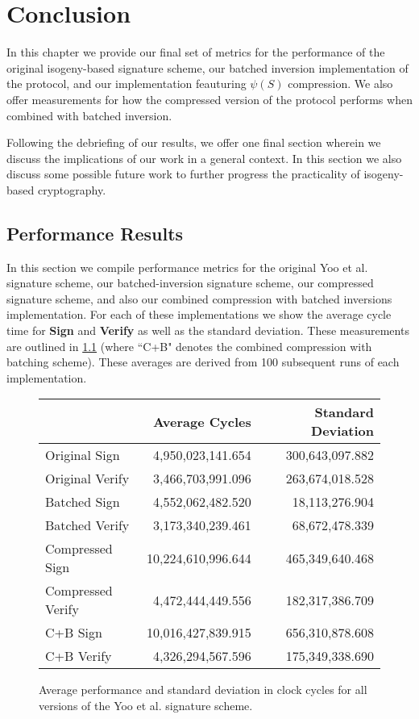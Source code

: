 \chapter{Conclusion}
\label{ch:conclusion}

In this chapter we provide our final set of metrics for the performance of the original isogeny-based signature scheme, our batched inversion implementation of the protocol, and our implementation feauturing $\psi(S)$ compression. We also offer measurements for how the compressed version of the protocol performs when combined with batched inversion.

Following the debriefing of our results, we offer one final section wherein we discuss the implications of our work in a general context. In this section we also discuss some possible future work to further progress the practicality of isogeny-based cryptography.



\section{Performance Results}

In this section we compile performance metrics for the original Yoo et al. signature scheme, our batched-inversion signature scheme, our compressed signature scheme, and also our combined compression with batched inversions implementation. For each of these implementations we show the average cycle time for \textbf{Sign} and \textbf{Verify} as well as the standard deviation. These measurements are outlined in \ref{fig:allmeasurements} (where ``C+B" denotes the combined compression with batching scheme). These averages are derived from 100 subsequent runs of each implementation.

\begin{figure}
\begin{center}
\begin{tabular}{ | l | r | r | }
\hline
& Average Cycles & Standard Deviation \\
\hline
Original Sign & 4,950,023,141.654 & 300,643,097.882 \\
Original Verify & 3,466,703,991.096 & 263,674,018.528 \\
Batched Sign & 4,552,062,482.520 & 18,113,276.904 \\
Batched Verify & 3,173,340,239.461 & 68,672,478.339 \\
Compressed Sign & 10,224,610,996.644 & 465,349,640.468 \\
Compressed Verify & 4,472,444,449.556 & 182,317,386.709 \\
C+B Sign & 10,016,427,839.915 & 656,310,878.608 \\
C+B Verify & 4,326,294,567.596 & 175,349,338.690 \\
\hline
\end{tabular}
\end{center}
\caption{Average performance and standard deviation in clock cycles for all versions of the Yoo et al. signature scheme.}
\label{fig:allmeasurements}
\end{figure}

